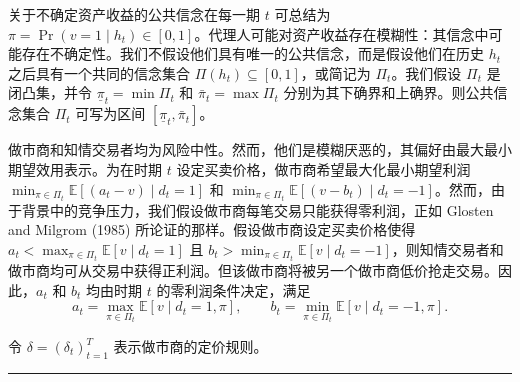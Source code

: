 \documentclass[12pt,a4paper]{article}
\newenvironment{translation}{%
  \par\vspace{2pt}\noindent%
  \color{transblue}%
  \ignorespaces
}{%
  \par\vspace{4pt}\hrule\vspace{6pt}%
}
\begin{document}
\begin{translation}
关于不确定资产收益的公共信念在每一期 $t$ 可总结为 $\pi = \Pr(v = 1 \mid h_t) \in [0, 1]$。代理人可能对资产收益存在模糊性：其信念中可能存在不确定性。我们不假设他们具有唯一的公共信念，而是假设他们在历史 $h_t$ 之后具有一个共同的信念集合 $\Pi(h_t) \subseteq [0, 1]$，或简记为 $\Pi_t$。我们假设 $\Pi_t$ 是闭凸集，并令 $\underline{\pi}_t = \min \Pi_t$ 和 $\bar{\pi}_t = \max \Pi_t$ 分别为其下确界和上确界。则公共信念集合 $\Pi_t$ 可写为区间 $[\underline{\pi}_t, \bar{\pi}_t]$。

做市商和知情交易者均为风险中性。然而，他们是模糊厌恶的，其偏好由最大最小期望效用表示。为在时期 $t$ 设定买卖价格，做市商希望最大化最小期望利润 $\min_{\pi \in \Pi_t} \mathbb{E}[(a_t - v) \mid d_t = 1]$ 和 $\min_{\pi \in \Pi_t} \mathbb{E}[(v - b_t) \mid d_t = -1]$。然而，由于背景中的竞争压力，我们假设做市商每笔交易只能获得零利润，正如 Glosten and Milgrom (1985) 所论证的那样。假设做市商设定买卖价格使得 $a_t < \max_{\pi \in \Pi_t} \mathbb{E}[v \mid d_t = 1]$ 且 $b_t > \min_{\pi \in \Pi_t} \mathbb{E}[v \mid d_t = -1]$，则知情交易者和做市商均可从交易中获得正利润。但该做市商将被另一个做市商低价抢走交易。因此，$a_t$ 和 $b_t$ 均由时期 $t$ 的零利润条件决定，满足
\[
a_t = \max_{\pi \in \Pi_t} \mathbb{E}[v \mid d_t = 1, \pi], \qquad
b_t = \min_{\pi \in \Pi_t} \mathbb{E}[v \mid d_t = -1, \pi]. \tag{2.1, 2.2}
\]

令 $\delta = (\delta_t)_{t=1}^{T}$ 表示做市商的定价规则。
\end{translation}
\end{document}
